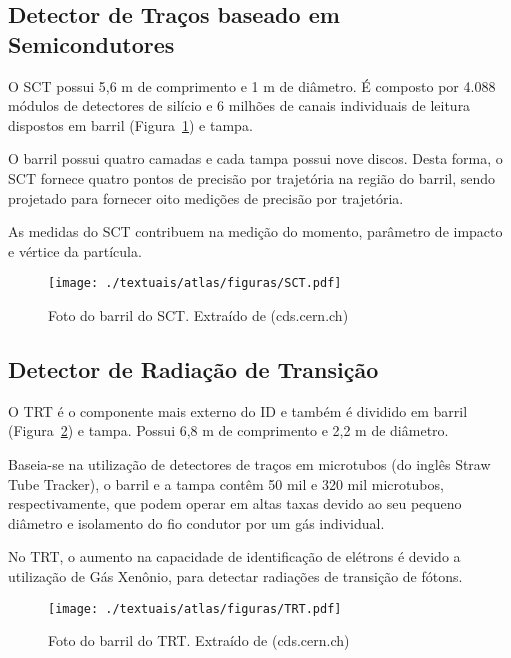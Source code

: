 \subsection{Detector de Traços baseado em Semicondutores }

O SCT \cite{collaboration2014operation} possui 5,6 m de comprimento e 1 m de diâmetro. É composto por 4.088 módulos de detectores de silício e 6 milhões de canais individuais de leitura dispostos em barril (Figura~\ref{fig:3T12}) e tampa.

O barril possui quatro camadas e cada tampa possui nove discos.  Desta forma, o SCT fornece quatro pontos de precisão por trajetória na região do barril, sendo projetado para  fornecer oito medições de precisão por trajetória.

As medidas do SCT contribuem na medição do momento, parâmetro de impacto e vértice da partícula.

\begin{figure}[h!]
	\centering
	\texttt{[image: ./textuais/atlas/figuras/SCT.pdf]}\\
	\caption{Foto do barril do SCT. Extraído de (cds.cern.ch)}
	\label{fig:3T12}
\end{figure}

\subsection{Detector de Radiação de Transição}

O TRT \cite{abat2008atlas} é o componente mais externo do ID e também é dividido em barril (Figura~\ref{fig:3T13}) e tampa. Possui 6,8 m de comprimento e 2,2 m de diâmetro.
	
Baseia-se na  utilização de detectores de traços em microtubos (do inglês Straw Tube Tracker), o barril e a tampa contêm 50 mil e 320 mil microtubos, respectivamente,  que podem operar em altas taxas devido ao seu pequeno diâmetro e isolamento do fio condutor por um gás individual.

No TRT, o aumento na capacidade de identificação de elétrons  é devido a utilização de Gás Xenônio, para detectar radiações de transição de fótons.

\begin{figure}[h!]
	\centering
	\texttt{[image: ./textuais/atlas/figuras/TRT.pdf]}\\
	\caption{Foto do barril do TRT. Extraído de (cds.cern.ch)}
	\label{fig:3T13}
\end{figure}

